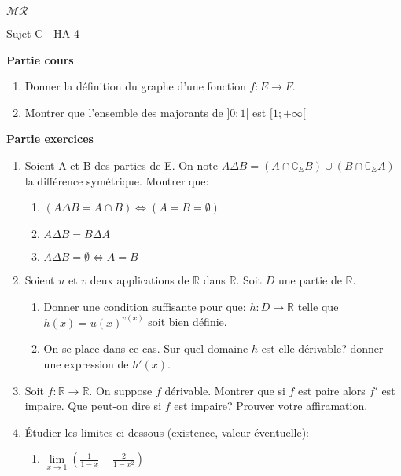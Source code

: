 \documentclass[a4paper,11pt, landscape]{article}
\begin{document}
\begin{multicols*}{4}
\begin{enumerate}[leftmargin=*]
\end{enumerate}
\centerline{$\mathcal{MR}$}
\vfill\null
\columnbreak
\centerline{Sujet C - HA 4}
\begin{flushleft}
  \textbf{Partie cours} 
\end{flushleft} 
\begin{enumerate}[leftmargin=*]
  \item Donner la définition du graphe d'une fonction $f : E \rightarrow F$.
  \item Montrer que l'ensemble des majorants de $]0; 1[$ est $[1; +\infty[$
\end{enumerate}
\textbf{Partie exercices}
\begin{enumerate}[leftmargin=*]
  \item Soient A et B des parties de E. On note $A \Delta B = (A \cap \complement_EB) \cup (B \cap \complement_EA)$ la différence symétrique. 
  Montrer que: 
  \begin{enumerate}
    \item $(A \Delta B = A \cap B) \Leftrightarrow (A = B = \emptyset)$
    \item $A \Delta B = B \Delta A$
    \item $A \Delta B = \emptyset \Leftrightarrow A = B$
  \end{enumerate}
  \item Soient $u$ et $v$ deux applications de $\mathbb{R}$ dans $\mathbb{R}$. Soit $D$ une partie de $\mathbb{R}$. 
  \begin{enumerate}
    \item Donner une condition suffisante pour que: $h : D \rightarrow \mathbb{R}$ telle que $h(x) = u(x)^{v(x)}$ soit bien définie. 
    \item On se place dans ce cas. Sur quel domaine $h$ est-elle dérivable? donner une expression de $h'(x)$.
  \end{enumerate}
  \item Soit $f : \mathbb{R} \rightarrow \mathbb{R}$. On suppose $f$ dérivable. Montrer que si $f$ est paire alors $f'$ est impaire. Que peut-on dire si $f$ est impaire? Prouver votre affiramation.
  \item Étudier les limites ci-dessous (existence, valeur éventuelle):
  \begin{enumerate}
    \item $\lim\limits_{x \rightarrow 1}\left(\frac{1}{1-x} - \frac{2}{1-x^2}\right)$

\end{enumerate}
\end{enumerate}
\end{multicols*}
\end{document}
